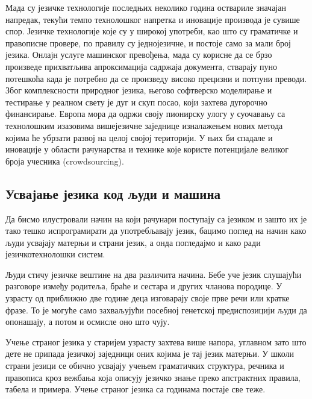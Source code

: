 \begin{multicols}{2}
Мада су језичке технологије последњих неколико година оствариле значајан напредак, текући темпо технолошког напретка и иновације про\-из\-во\-да је сувише спор. Језичке технологије које су у широкој употреби, као што су граматичке и правописне провере, по правилу су једнојезичне, и постоје само за мали број језика. Онлајн услуге машинског превођења, мада су корисне да се брзо произведе при\-хват\-љи\-ва апроксимација садржаја документа, стварају пуно потешкоћа када је потребно да се произведу високо прецизни и потпуни преводи. Због комплексности природног језика, његово софтверско моделирање и тестирање у реалном свету је дуг и скуп посао, који захтева дугорочно финансирање. Европа мора да одржи своју пионирску улогу у суочавању са технолошким изазовима вишејезичне заједнице изналажењем нових метода којима ће убрзати развој на целој својој територији. У њих би спадале и иновације у области рачунарства и  технике које користе потенцијале великог броја учесника (crowdsourcing). 

\subsection {Усвајање језика код људи и машина}
  
Да бисмо илустровали начин на који рачунари поступају са језиком и зашто их је тако тешко испрограмирати да употребљавају језик, бацимо поглед на начин како људи усвајају матерњи и страни језик, а онда погледајмо и како ради језичкотехнолошки систем. 

Људи стичу језичке вештине на два различита начина. Бебе уче језик слушајући  разговоре између родитеља, браће и сестара и других чланова породице. У узрасту од приближно две године деца изговарају своје прве речи или кратке фразе. То је могуће само захваљујући посебној генетској предиспозицији људи да опонашају, а потом и осмисле оно што чују. 

Учење страног језика у старијем узрасту захтева више напора, углавном зато што дете не припада језичкој заједници оних којима је тај језик матерњи. У школи страни језици се обично усвајају учењем граматичких структура, речника и правописа кроз вежбања која описују језичко знање преко апстрактних правила, табела и примера.  Учење страног језика са годинама постаје све теже. 



\end{multicols}
